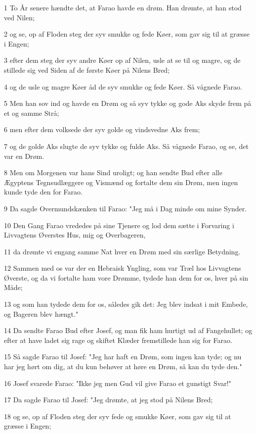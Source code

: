 \par 1 To År senere hændte det, at Farao havde en drøm. Han drømte, at han stod ved Nilen;
\par 2 og se, op af Floden steg der syv smukke og fede Køer, som gav sig til at græsse i Engen;
\par 3 efter dem steg der syv andre Køer op af Nilen, usle at se til og magre, og de stillede sig ved Siden af de første Køer på Nilens Bred;
\par 4 og de usle og magre Køer åd de syv smukke og fede Køer. Så vågnede Farao.
\par 5 Men han sov ind og havde en Drøm og så syv tykke og gode Aks skyde frem på et og samme Strå;
\par 6 men efter dem volksede der syv golde og vindsvedne Aks frem;
\par 7 og de golde Aks slugte de syv tykke og fulde Aks. Så vågnede Farao, og se, det var en Drøm.
\par 8 Men om Morgenen var hans Sind uroligt; og han sendte Bud efter alle Ægyptens Tegnsudlæggere og Vismænd og fortalte dem sin Drøm, men ingen kunde tyde den for Farao.
\par 9 Da sagde Overmundskænken til Farao: "Jeg må i Dag minde om mine Synder.
\par 10 Den Gang Farao vrededes på sine Tjenere og lod dem sætte i Forvaring i Livvagtens Øverstes Hus, mig og Overbageren,
\par 11 da drømte vi engang samme Nat hver en Drøm med sin særlige Betydning.
\par 12 Sammen med os var der en Hebraisk Yngling, som var Træl hos Livvagtens Øverste, og da vi fortalte ham vore Drømme, tydede han dem for os, hver på sin Måde;
\par 13 og som han tydede dem for os, således gik det: Jeg blev indsat i mit Embede, og Bageren blev hængt."
\par 14 Da sendte Farao Bud efter Josef, og man fik ham hurtigt ud af Fangehullet; og efter at have ladet sig rage og skiftet Klæder fremstillede han sig for Farao.
\par 15 Så sagde Farao til Josef: "Jeg har haft en Drøm, som ingen kan tyde; og nu har jeg hørt om dig, at du kun behøver at høre en Drøm, så kan du tyde den."
\par 16 Josef svarede Farao: "Ikke jeg men Gud vil give Farao et gunstigt Svar!"
\par 17 Da sagde Farao til Josef: "Jeg drømte, at jeg stod på Nilens Bred;
\par 18 og se, op af Floden steg der syv fede og smukke Køer, som gav sig til at græsse i Engen;
